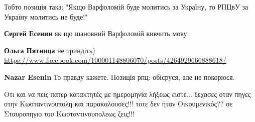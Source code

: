 \begin{itemize}
 
Тобто позиція така: "Якщо Варфоломій буде молитись за Україну, то РПЦвУ за Україну молитись не буде!"

\begin{itemize}
 
\textbf{Сергей Есенин} як що шановний Варфоломій вивчить мову.

\begin{itemize}
 
\textbf{Ольга Пятница} не триндіть) \url{https://www.facebook.com/100001148806070/posts/4264929666888618/}
\end{itemize}

 
\textbf{Nazar Esenin} То правду кажете. Позиція рпц: обісруся, але не покорюся.

\end{itemize}

 

Οτι και να πεις πατερ κατακτητές με ημερομηνία λήξεως ειστε... ξεχασες οταν
πηγες στην Κωσταντινουπολη και παρακαλουσες!!! τοτε δεν ήταν Οικουμενικός?? σε
Σταυροπηγιο του Κωσταντινουπολεως ζεις!!!


 


\end{itemize}
